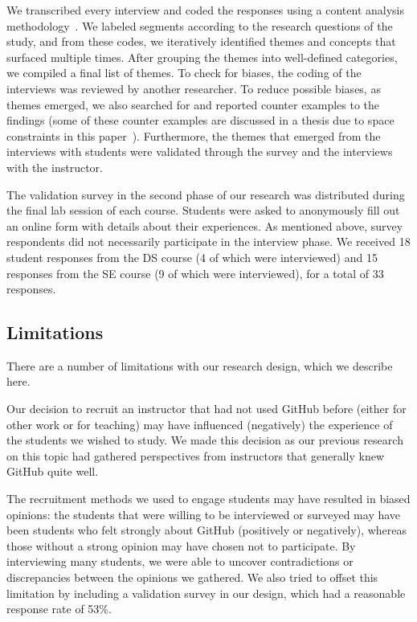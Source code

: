 We transcribed every interview and coded the responses using a content analysis methodology~\cite{charmaz2006constructing}.
We labeled segments according to the research questions of the study, and from these codes, we iteratively identified themes and concepts that surfaced multiple times. After grouping the themes into well-defined categories, we compiled a final list of themes. To check for biases, the coding of the interviews was reviewed by another researcher. To reduce possible biases, as themes emerged, we also searched for and reported counter examples to the findings (some of these counter examples are discussed in a thesis due to space constraints in this paper~\cite{feliciano2015towards}). Furthermore, the themes that emerged from the interviews with students were validated through the survey and the interviews with the instructor.

The validation survey in the second phase of our research was distributed during the final lab session of each course. Students were asked to anonymously fill out an online form with details about their experiences. As mentioned above, survey respondents did not necessarily participate in the interview phase. We received 18 student responses from the DS course (4 of which were interviewed) and 15 responses from the SE course (9 of which were interviewed), for a total of 33 responses.

\subsection{Limitations}
There are a number of limitations with our research design, which we describe here.

Our decision to recruit an instructor that had not used GitHub before (either for other work or for teaching) may have influenced (negatively) the experience of the students we wished to study. We made this decision as our previous research on this topic had gathered perspectives from instructors that generally knew GitHub quite well.

The recruitment methods we used to engage students may have resulted in biased opinions: the students that were willing to be interviewed or surveyed may have been students who felt strongly about GitHub (positively or negatively), whereas those without a strong opinion may have chosen not to participate. By interviewing many students, we were able to uncover contradictions or discrepancies between the opinions we gathered. We also tried to offset this limitation by including a validation survey in our design, which had a reasonable response rate of 53\%.

